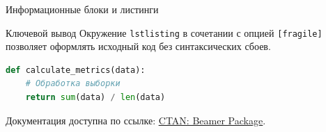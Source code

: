 \documentclass[aspectratio=169]{beamer}
\begin{document}
\begin{frame}[fragile]{Информационные блоки и листинги}
    \begin{block}{Ключевой вывод}
        Окружение \texttt{lstlisting} в сочетании с опцией \texttt{[fragile]} позволяет оформлять исходный код без синтаксических сбоев.
    \end{block}

    \vspace{0.5em}
    \begin{lstlisting}[language=Python]
def calculate_metrics(data):
    # Обработка выборки
    return sum(data) / len(data)
    \end{lstlisting}

    \vspace{0.5em}
    Документация доступна по ссылке: \href{https://ctan.org/pkg/beamer}{\color{blue}\underline{CTAN: Beamer Package}}.
\end{frame}
\end{document}
